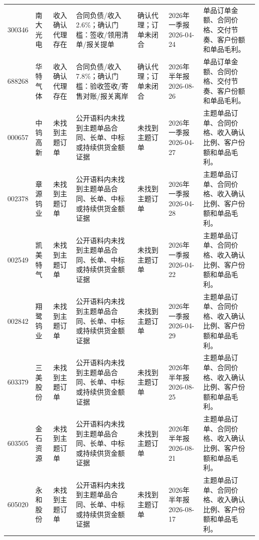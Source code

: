 \begin{exhibitbox}[订单持续性与收入确认耐久性证据]
\begin{tabularx}{\exhibitboxwidth}{L{0.85cm} L{1.15cm} L{1.45cm} X L{1.65cm} L{1.5cm} X}
300346 & 南大光电 & 收入确认代理存在 & 合同负债/收入2.6\%；确认门槛：签收/领用清单/报关提单 & 确认代理；订单未闭合 & 2026年 一季报 2026-04-24 & 单品订单金额、合同价格、交付节奏、客户份额和单品毛利。 \\
688268 & 华特气体 & 收入确认代理存在 & 合同负债/收入7.8\%；确认门槛：验收签收/寄售对账/报关离岸 & 确认代理；订单未闭合 & 2026年 半年报 2026-08-26 & 单品订单金额、合同价格、交付节奏、客户份额和单品毛利。 \\
000657 & 中钨高新 & 未找到主题订单 & 公开语料内未找到主题单品合同、长单、中标或持续供货金额证据 & 未找到主题订单 & 2026年 一季报 2026-04-27 & 主题单品订单、合同价格、收入确认比例、客户份额和单品毛利。 \\
002378 & 章源钨业 & 未找到主题订单 & 公开语料内未找到主题单品合同、长单、中标或持续供货金额证据 & 未找到主题订单 & 2026年 一季报 2026-04-28 & 主题单品订单、合同价格、收入确认比例、客户份额和单品毛利。 \\
002549 & 凯美特气 & 未找到主题订单 & 公开语料内未找到主题单品合同、长单、中标或持续供货金额证据 & 未找到主题订单 & 2026年 一季报 2026-04-22 & 主题单品订单、合同价格、收入确认比例、客户份额和单品毛利。 \\
002842 & 翔鹭钨业 & 未找到主题订单 & 公开语料内未找到主题单品合同、长单、中标或持续供货金额证据 & 未找到主题订单 & 2026年 一季报 2026-04-29 & 主题单品订单、合同价格、收入确认比例、客户份额和单品毛利。 \\
603379 & 三美股份 & 未找到主题订单 & 公开语料内未找到主题单品合同、长单、中标或持续供货金额证据 & 未找到主题订单 & 2026年 半年报 2026-08-25 & 主题单品订单、合同价格、收入确认比例、客户份额和单品毛利。 \\
603505 & 金石资源 & 未找到主题订单 & 公开语料内未找到主题单品合同、长单、中标或持续供货金额证据 & 未找到主题订单 & 2026年 半年报 2026-08-21 & 主题单品订单、合同价格、收入确认比例、客户份额和单品毛利。 \\
605020 & 永和股份 & 未找到主题订单 & 公开语料内未找到主题单品合同、长单、中标或持续供货金额证据 & 未找到主题订单 & 2026年 半年报 2026-08-17 & 主题单品订单、合同价格、收入确认比例、客户份额和单品毛利。 \\
\bottomrule
\end{tabularx}
\end{exhibitbox}

